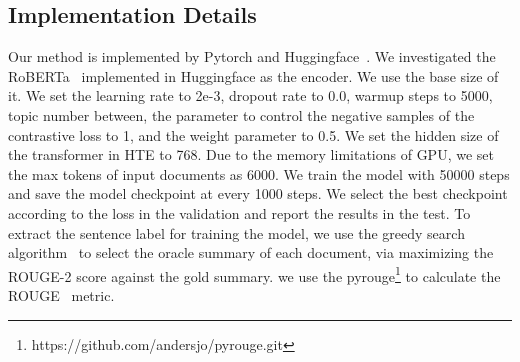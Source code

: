 \documentclass[11pt]{article}
\begin{document}
\subsection{Implementation Details}
\label{imp}
Our method is implemented by Pytorch and Huggingface~\cite{wolf2020transformers}. 
We investigated the RoBERTa~\cite{liu2019roberta} implemented in Huggingface as the encoder. 
We use the base size of it.
We set the learning rate to 2e-3, dropout rate to 0.0, warmup steps to 5000, topic number between, the parameter to control the negative samples of the contrastive loss  to 1, and the weight parameter  to 0.5. 
We set the hidden size of the transformer in HTE to 768.
Due to the memory limitations of GPU, we set the max tokens of input documents as 6000.
We train the model with 50000 steps and save the model checkpoint at every 1000 steps. 
We select the best checkpoint according to the loss in the validation and report the results in the test. 
To extract the sentence label for training the model, we use the greedy search algorithm~\cite{nallapati2017summarunner} to select the oracle summary of each document, via maximizing the ROUGE-2 score against the gold summary.
we use the pyrouge\footnote{https://github.com/andersjo/pyrouge.git} to calculate the ROUGE~\cite{lin2004rouge} metric.
\end{document}
